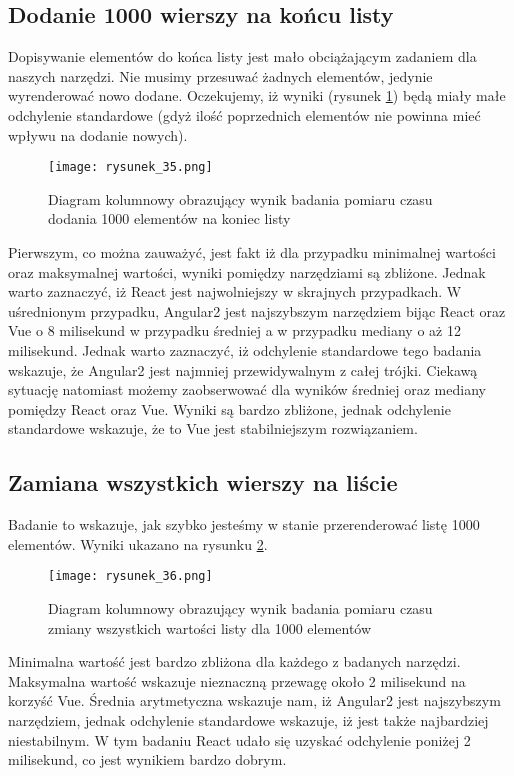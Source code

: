 \subsection{Dodanie 1000 wierszy na końcu listy}

Dopisywanie elementów do końca listy jest mało obciążającym zadaniem dla naszych narzędzi. Nie musimy przesuwać żadnych elementów, jedynie wyrenderować nowo dodane.
Oczekujemy, iż wyniki (rysunek \ref{fig:rysunek_35}) będą miały małe odchylenie standardowe (gdyż ilość poprzednich elementów nie powinna mieć wpływu na dodanie nowych).

\begin{figure}[!ht]
    \centering
    \texttt{[image: rysunek\_35.png]}
    \caption{Diagram kolumnowy obrazujący wynik badania pomiaru czasu dodania 1000 elementów na koniec listy}
    \label{fig:rysunek_35}
\end{figure}

Pierwszym, co można zauważyć, jest fakt iż dla przypadku minimalnej wartości oraz maksymalnej wartości, wyniki pomiędzy narzędziami są zbliżone.
Jednak warto zaznaczyć, iż React jest najwolniejszy w skrajnych przypadkach.
W uśrednionym przypadku, Angular2 jest najszybszym narzędziem bijąc React oraz Vue o 8 milisekund w przypadku średniej a w przypadku mediany o aż 12 milisekund.
Jednak warto zaznaczyć, iż odchylenie standardowe tego badania wskazuje, że Angular2 jest najmniej przewidywalnym z całej trójki.
Ciekawą sytuację natomiast możemy zaobserwować dla wyników średniej oraz mediany pomiędzy React oraz Vue.
Wyniki są bardzo zbliżone, jednak odchylenie standardowe wskazuje, że to Vue jest stabilniejszym rozwiązaniem.

\subsection{Zamiana wszystkich wierszy na liście}

Badanie to wskazuje, jak szybko jesteśmy w stanie przerenderować listę 1000 elementów. Wyniki ukazano na rysunku \ref{fig:rysunek_36}.

\begin{figure}[!ht]
    \centering
    \texttt{[image: rysunek\_36.png]}
    \caption{Diagram kolumnowy obrazujący wynik badania pomiaru czasu zmiany wszystkich wartości listy dla 1000 elementów}
    \label{fig:rysunek_36}
\end{figure}

Minimalna wartość jest bardzo zbliżona dla każdego z badanych narzędzi. Maksymalna wartość wskazuje nieznaczną przewagę około 2 milisekund na korzyść Vue.
Średnia arytmetyczna wskazuje nam, iż Angular2 jest najszybszym narzędziem, jednak odchylenie standardowe wskazuje, iż jest także najbardziej niestabilnym.
W tym badaniu React udało się uzyskać odchylenie poniżej 2 milisekund, co jest wynikiem bardzo dobrym.

